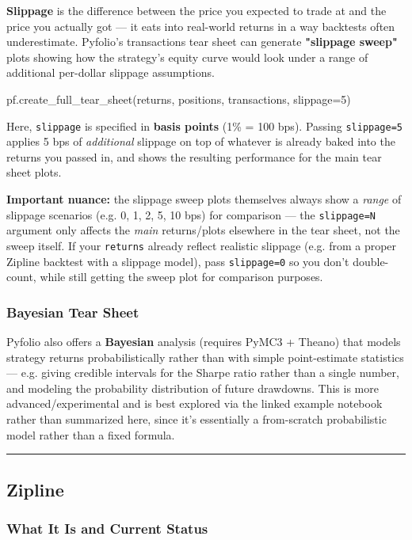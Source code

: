 \documentclass[12pt,openany]{book}
\theoremstyle{definition}
\theoremstyle{remark}
\begin{document}
\textbf{Slippage} is the difference between the price you expected to trade at and the price you actually got — it eats into real-world returns in a way backtests often underestimate. Pyfolio's transactions tear sheet can generate \textbf{"slippage sweep"} plots showing how the strategy's equity curve would look under a range of additional per-dollar slippage assumptions.

\begin{python}
pf.create_full_tear_sheet(returns, positions, transactions, slippage=5)
\end{python}

Here, \texttt{slippage} is specified in \textbf{basis points} (1\% = 100 bps). Passing \texttt{slippage=5} applies 5 bps of \emph{additional} slippage on top of whatever is already baked into the returns you passed in, and shows the resulting performance for the main tear sheet plots.

\textbf{Important nuance:} the slippage sweep plots themselves always show a \emph{range} of slippage scenarios (e.g. 0, 1, 2, 5, 10 bps) for comparison — the \texttt{slippage=N} argument only affects the \emph{main} returns/plots elsewhere in the tear sheet, not the sweep itself. If your \texttt{returns} already reflect realistic slippage (e.g. from a proper Zipline backtest with a slippage model), pass \texttt{slippage=0} so you don't double-count, while still getting the sweep plot for comparison purposes.
\subsubsection{Bayesian Tear Sheet}

Pyfolio also offers a \textbf{Bayesian} analysis (requires PyMC3 + Theano) that models strategy returns probabilistically rather than with simple point-estimate statistics — e.g. giving credible intervals for the Sharpe ratio rather than a single number, and modeling the probability distribution of future drawdowns. This is more advanced/experimental and is best explored via the linked example notebook rather than summarized here, since it's essentially a from-scratch probabilistic model rather than a fixed formula.

\medskip
\hrule
\medskip
\subsection{Zipline}
\subsubsection{What It Is and Current Status}
\end{document}
